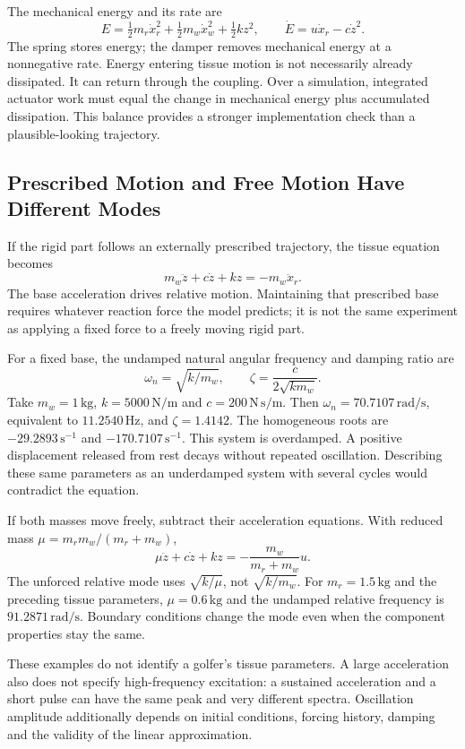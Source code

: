 The mechanical energy and its rate are
\[
E=\tfrac12m_r\dot x_r^2+\tfrac12m_w\dot x_w^2+\tfrac12kz^2,
\qquad
\dot E=u\dot x_r-c\dot z^2.
\]
The spring stores energy; the damper removes mechanical energy at a nonnegative rate. Energy entering tissue motion is not necessarily already dissipated. It can return through the coupling. Over a simulation, integrated actuator work must equal the change in mechanical energy plus accumulated dissipation. This balance provides a stronger implementation check than a plausible-looking trajectory.

\subsection{Prescribed Motion and Free Motion Have Different Modes}

If the rigid part follows an externally prescribed trajectory, the tissue equation becomes
\[
m_w\ddot z+c\dot z+kz=-m_w\ddot x_r.
\]
The base acceleration drives relative motion. Maintaining that prescribed base requires whatever reaction force the model predicts; it is not the same experiment as applying a fixed force to a freely moving rigid part.

For a fixed base, the undamped natural angular frequency and damping ratio are
\[
\omega_n=\sqrt{k/m_w},\qquad
\zeta=\frac{c}{2\sqrt{km_w}}.
\]
Take $m_w=1\,\mathrm{kg}$, $k=5000\,\mathrm{N/m}$ and $c=200\,\mathrm{N\,s/m}$. Then $\omega_n=70.7107\,\mathrm{rad/s}$, equivalent to $11.2540\,\mathrm{Hz}$, and $\zeta=1.4142$. The homogeneous roots are $-29.2893\,\mathrm{s^{-1}}$ and $-170.7107\,\mathrm{s^{-1}}$. This system is overdamped. A positive displacement released from rest decays without repeated oscillation. Describing these same parameters as an underdamped system with several cycles would contradict the equation.

If both masses move freely, subtract their acceleration equations. With reduced mass $\mu=m_rm_w/(m_r+m_w)$,
\[
\mu\ddot z+c\dot z+kz=-\frac{m_w}{m_r+m_w}u.
\]
The unforced relative mode uses $\sqrt{k/\mu}$, not $\sqrt{k/m_w}$. For $m_r=1.5\,\mathrm{kg}$ and the preceding tissue parameters, $\mu=0.6\,\mathrm{kg}$ and the undamped relative frequency is $91.2871\,\mathrm{rad/s}$. Boundary conditions change the mode even when the component properties stay the same.

These examples do not identify a golfer's tissue parameters. A large acceleration also does not specify high-frequency excitation: a sustained acceleration and a short pulse can have the same peak and very different spectra. Oscillation amplitude additionally depends on initial conditions, forcing history, damping and the validity of the linear approximation.

